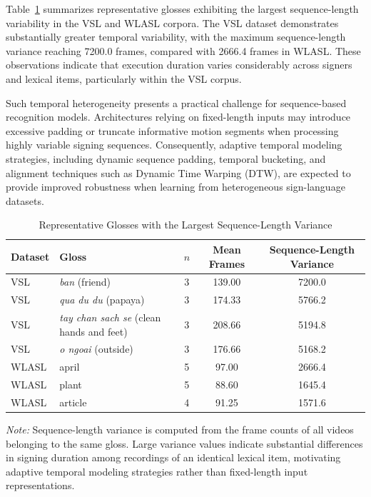 \documentclass{ieeeaccess}
\begin{document}
Table~\ref{tab:app_sequence} summarizes representative glosses exhibiting the largest sequence-length variability in the VSL and WLASL corpora. The VSL dataset demonstrates substantially greater temporal variability, with the maximum sequence-length variance reaching 7200.0 frames, compared with 2666.4 frames in WLASL. These observations indicate that execution duration varies considerably across signers and lexical items, particularly within the VSL corpus.

Such temporal heterogeneity presents a practical challenge for sequence-based recognition models. Architectures relying on fixed-length inputs may introduce excessive padding or truncate informative motion segments when processing highly variable signing sequences. Consequently, adaptive temporal modeling strategies, including dynamic sequence padding, temporal bucketing, and alignment techniques such as Dynamic Time Warping (DTW), are expected to provide improved robustness when learning from heterogeneous sign-language datasets.

\begin{table}[!t]
\caption{Representative Glosses with the Largest Sequence-Length Variance}
\label{tab:app_sequence}

\centering
\small
\setlength{\tabcolsep}{6pt}

\begin{tabular}{llccc}
\toprule
\textbf{Dataset} &
\textbf{Gloss} &
\textbf{$n$} &
\textbf{Mean Frames} &
\textbf{Sequence-Length Variance} \\
\midrule

VSL &
\textit{ban} (friend) &
3 &
139.00 &
7200.0 \\

VSL &
\textit{qua du du} (papaya) &
3 &
174.33 &
5766.2 \\

VSL &
\textit{tay chan sach se} (clean hands and feet) &
3 &
208.66 &
5194.8 \\

VSL &
\textit{o ngoai} (outside) &
3 &
176.66 &
5168.2 \\

\midrule

WLASL &
april &
5 &
97.00 &
2666.4 \\

WLASL &
plant &
5 &
88.60 &
1645.4 \\

WLASL &
article &
4 &
91.25 &
1571.6 \\

\bottomrule
\end{tabular}

\vspace{2mm}

\footnotesize
\textit{Note:}
Sequence-length variance is computed from the frame counts of all videos belonging to the same gloss.
Large variance values indicate substantial differences in signing duration among recordings of an identical lexical item, motivating adaptive temporal modeling strategies rather than fixed-length input representations.

\end{table}
\end{document}
